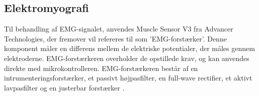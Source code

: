 


\subsection{Elektromyografi}
Til behandling af EMG-signalet, anvendes Muscle Sensor V3 fra Advancer Technologies, der fremover vil refereres til som 'EMG-forstærker'. Denne komponent måler en differens mellem de elektriske potentialer, der måles gennem elektroderne. EMG-forstærkeren overholder de opstillede krav, og kan anvendes direkte med mikrokontrolleren. EMG-forstærkeren består af en intrumenteringsforstærker, et passivt højpasfilter, en full-wave rectifier, et aktivt lavpasfilter og en justerbar forstærker \citep{advancertech2013}. 

